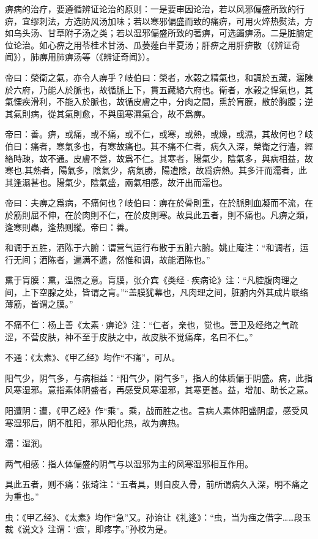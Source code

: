 \documentclass[draft,12pt]{ctexbook}
\begin{document}

痹病的治疗，要遵循辨证论治的原则：一是要审因论治，若以风邪偏盛所致的行痹，宜缪刺法，方选防风汤加味；若以寒邪偏盛而致的痛痹，可用火焠热熨法，方如乌头汤、甘草附子汤之类；若以湿邪偏盛所致的著痹，可选蠲痹汤。二是脏腑定位论治。如心痹之用苓桂术甘汤、瓜蒌薤白半夏汤；肝痹之用肝痹散（《辨证奇闻》），肺痹用肺痹汤等（《辨证奇闻》）。


\begin{yuanwen}
帝曰：榮衛之氣，亦令人痹乎？岐伯曰：榮者，水榖之精氣也，和調於五藏，灑陳於六府，乃能人於脈也，故循脈上下，貫五藏絡六府也。衛者，水榖之悍氣也，其氣慄疾滑利，不能入於脈也，故循皮膚之中，分肉之間，熏於肓膜，散於胸腹；逆其氣則病，從其氣則愈，不與風寒濕氣合，故不爲痹。

帝曰：善。痹，或痛，或不痛，或不仁，或寒，或熱，或燥，或濕，其故何也？岐伯曰：痛者，寒氣多也，有寒故痛也。其不痛不仁者，病久入深，榮衛之行濇，經絡時疎，故不通。皮膚不營，故爲不仁。其寒者，陽氣少，陰氣多，與病相益，故寒也.其熱者，陽氣多，陰氣少，病氣勝，陽遭陰，故爲痹熱。其多汗而濡者，此其逢濕甚也。陽氣少，陰氣盛，兩氣相感，故汗出而濡也。

帝曰：夫痹之爲病，不痛何也？岐伯曰：痹在於骨則重，在於脈則血凝而不流，在於筋則屈不伸，在於肉則不仁，在於皮則寒。故具此五者，則不痛也。凡痹之類，逢寒則蟲，逢热则縱。帝曰：善。
\end{yuanwen}


\begin{jiaozhu}
	\item 和调于五胜，洒陈于六腑：谓营气运行布散于五脏六腑。姚止庵注：“和调者，运行无间；洒陈者，遍满不遗，然惟和调，故能洒陈也。”
	\item 熏于肓膜：熏，温煦之意。肓膜，张介宾《类经·疾病论》注：“凡腔腹肉理之间，上下空腺之处，皆谓之肓。”“盖膜犹幕也，凡肉理之间，脏腑内外其成片联络薄筋，皆谓之膜。”
	\item 不痛不仁：杨上善《太素·痹论》注：“仁者，亲也，觉也。营卫及经络之气疏涩，不营皮肤，神不至于皮肤之中，故皮肤不觉痛痒，名曰不仁。”
	\item 不通：《太素》、《甲乙经》均作“不痛”，可从。
	\item 阳气少，阴气多，与病相益：“阳气少，阴气多”，指人的体质偏于阴盛。病，此指风寒湿邪。意指素体阴盛者，再感受风寒湿邪，其寒更甚。益，增加、助长之意。
	\item 阳遭阴：遭，《甲乙经》作“乘”。乘，战而胜之也。言病人素体阳盛阴虚，感受风寒湿邪后，阴不胜阳，邪从阳化热，故为痹热。
	\item 濡：湿润。
	\item 两气相感：指人体偏盛的阴气与以湿邪为主的风寒湿邪相互作用。
	\item 具此五者，则不痛：张琦注：“五者具，则自皮入骨，前所谓病久入深，明不痛之为重也。”
	\item 虫：《甲乙经》、《太素》均作“急”又。孙诒让《礼迻》：“虫，当为痋之借字……段玉裁《说文》注谓：‘痋’，即疼字。”孙校为是。
\end{jiaozhu}
\end{document}
